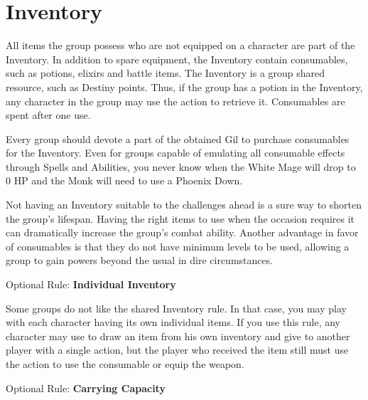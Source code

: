 \begin{tabacc}[label=inv-acc1]
    
\end{tabacc}

\clearpage
\section{Inventory}\label{sec:inv-inventory}

\begin{multicols}{2}
All items the group possess who are not equipped on a character are part of the Inventory. In addition to spare equipment, the Inventory contain consumables, such as potions, elixirs and battle items. The Inventory is a group shared resource, such as Destiny points. Thus, if the group has a potion in the Inventory, any character in the group may use the  action to retrieve it. Consumables are spent after one use.

Every group should devote a part of the obtained Gil to purchase consumables for the Inventory. Even for groups capable of emulating all consumable effects through Spells and Abilities, you never know when the White Mage will drop to 0 HP and the Monk will need to use a Phoenix Down.

Not having an Inventory suitable to the challenges ahead is a sure way to shorten the group's lifespan. Having the right items to use when the occasion requires it can dramatically increase the group’s combat ability. Another advantage in favor of consumables is that they do not have minimum levels to be used, allowing a group to gain powers beyond the usual in dire circumstances.

\begin{center}
\end{center}

\begin{boco}
Optional Rule: \textbf{Individual Inventory} \pc%

Some groups do not like the shared Inventory rule. In that case, you may play with each character having its own individual items. If you use this rule, any character may use  to draw an item from his own inventory and give to another player with a single action, but the player who received the item still must use the  action to use the consumable or equip the weapon. \pw%

Optional Rule: \textbf{Carrying Capacity} \pc%


\end{boco}
\end{multicols}
